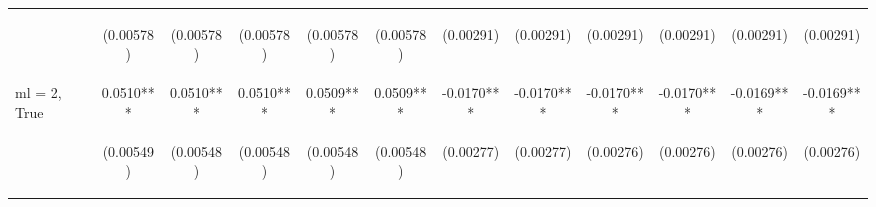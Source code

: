 \documentclass[]{article}
\begin{document}
\begin{center}
\begin{tabular}{lccccccccccc}
\vspace{4pt} & \begin{footnotesize}(0.00578)\end{footnotesize} & \begin{footnotesize}(0.00578)\end{footnotesize} & \begin{footnotesize}(0.00578)\end{footnotesize} & \begin{footnotesize}(0.00578)\end{footnotesize} & \begin{footnotesize}(0.00578)\end{footnotesize} & \begin{footnotesize}(0.00291)\end{footnotesize} & \begin{footnotesize}(0.00291)\end{footnotesize} & \begin{footnotesize}(0.00291)\end{footnotesize} & \begin{footnotesize}(0.00291)\end{footnotesize} & \begin{footnotesize}(0.00291)\end{footnotesize} & \begin{footnotesize}(0.00291)\end{footnotesize} \\
ml = 2, True & 0.0510*** & 0.0510*** & 0.0510*** & 0.0509*** & 0.0509*** & -0.0170*** & -0.0170*** & -0.0170*** & -0.0170*** & -0.0169*** & -0.0169*** \\
\vspace{4pt} & \begin{footnotesize}(0.00549)\end{footnotesize} & \begin{footnotesize}(0.00548)\end{footnotesize} & \begin{footnotesize}(0.00548)\end{footnotesize} & \begin{footnotesize}(0.00548)\end{footnotesize} & \begin{footnotesize}(0.00548)\end{footnotesize} & \begin{footnotesize}(0.00277)\end{footnotesize} & \begin{footnotesize}(0.00277)\end{footnotesize} & \begin{footnotesize}(0.00276)\end{footnotesize} & \begin{footnotesize}(0.00276)\end{footnotesize} & \begin{footnotesize}(0.00276)\end{footnotesize} & \begin{footnotesize}(0.00276)\end{footnotesize} \\

\end{tabular}
\end{center}
\end{document}
